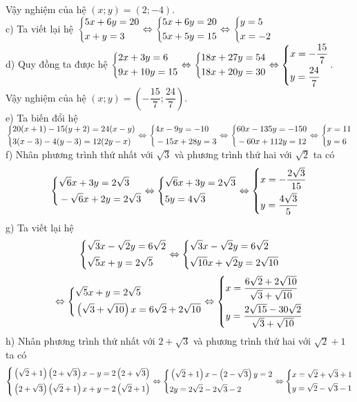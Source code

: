 \begin{ex}
{Vậy nghiệm của hệ $(x;y)=(2;-4)$.\\
c) Ta viết lại hệ $\left\{\begin{aligned}& 5x+6y=20\\ & x+y=3\end{aligned}\right.\Leftrightarrow \left\{\begin{aligned}& 5x+6y=20\\ & 5x+5y= 15\end{aligned}\right.\Leftrightarrow \left\{\begin{aligned}& y=5\\ & x=-2\end{aligned}\right.$\\
d) Quy đồng  ta  được hệ 
$\left\{\begin{aligned}& 2x+3y=6\\ & 9x +10y=15\end{aligned}\right.\Leftrightarrow \left\{\begin{aligned}& 18x +27y=54\\ & 18x +20y =30\end{aligned}\right.\Leftrightarrow \left\{\begin{aligned}& x=-\dfrac{15}{7} \\ & y=\dfrac{24}{7}\end{aligned}\right.$.\\
Vậy nghiệm của  hệ $(x;y)=\left(-\dfrac{15}{7};\dfrac{24}{7}\right)$.\\
e) Ta  biến đổi  hệ\\ $\left\{\begin{aligned}& 20(x+1) - 15(y+2) =24(x-y)\\ & 3(x-3)-4(y-3) =12(2y-x)\end{aligned}\right. \Leftrightarrow \left\{\begin{aligned}& 4x-9y=-10\\ & -15x+28y=3\end{aligned}\right.\Leftrightarrow \left\{\begin{aligned}& 60x - 135y =-150\\ & -60x + 112 y =12\end{aligned}\right. \Leftrightarrow \left\{\begin{aligned}& x=11\\ & y=6\end{aligned}\right. $\\
f) Nhân phương trình thứ  nhất với $\sqrt{3}$ và  phương trình  thứ hai với  $\sqrt{2}$ ta  có
$$ \left\{\begin{aligned}& \sqrt{6} x +3y=2\sqrt{3}\\ & -\sqrt{6} x +2y=2\sqrt{3}\end{aligned}\right.\Leftrightarrow \left\{\begin{aligned}& \sqrt{6} x +3y=2\sqrt{3} \\ & 5y=4\sqrt{3}\end{aligned}\right.\Leftrightarrow \left\{\begin{aligned}& x=-\dfrac{2\sqrt{3}}{15}\\ & y=\dfrac{4\sqrt{3}}{5}\end{aligned}\right. $$
   g) Ta viết lại hệ 
   $$
   \left\{\begin{aligned}& \sqrt{3}x -\sqrt{2}y=6\sqrt{2}\\ & \sqrt{5}x +y=2\sqrt{5}\end{aligned}\right. \Leftrightarrow \left\{\begin{aligned}& \sqrt{3}x -\sqrt{2}y=6\sqrt{2}\\ & \sqrt{10}x +\sqrt{2}y=2\sqrt{10}\end{aligned}\right.
   $$
   $$
   \Leftrightarrow \left\{\begin{aligned}& \sqrt{5}x+y=2\sqrt{5}\\ & \left(\sqrt{3}+\sqrt{10}\right) x= 6\sqrt{2}+2\sqrt{10}\end{aligned}\right.
     \Leftrightarrow \left\{\begin{aligned}& x=\dfrac{6\sqrt{2}+2\sqrt{10}}{\sqrt{3}+\sqrt{10}}\\
   & y= \dfrac{2\sqrt{15}-30\sqrt{2}}{\sqrt{3}+\sqrt{10}}\end{aligned}\right.
      $$
   h) Nhân phương trình thứ  nhất với $2+\sqrt{3}$ và  phương trình  thứ hai với  $\sqrt{2}+1$ ta  có
   $$ \left\{\begin{aligned}& \left(\sqrt{2}+1\right)\left(2+\sqrt{3}\right) x-y=2\left(2+\sqrt{3}\right)\\ & \left(2+\sqrt{3}\right)\left(\sqrt{2}+1\right) x +y=2\left(\sqrt{2}+1\right)\end{aligned}\right.
     \Leftrightarrow \left\{\begin{aligned}& \left(\sqrt{2}+1\right) x-\left(2-\sqrt{3}\right) y=2\\ & 2y=2\sqrt{2}-2\sqrt{3}-2\end{aligned}\right.
      \Leftrightarrow \left\{\begin{aligned}&  x=\sqrt{2}+\sqrt{3}+1\\ & y=\sqrt{2}-\sqrt{3}-1\end{aligned}\right.
    $$
        }
\end{ex} 
 
